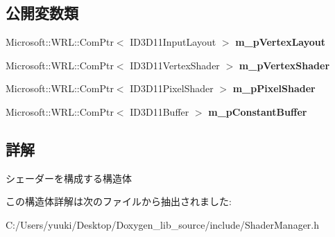 \subsection*{公開変数類}
\begin{DoxyCompactItemize}
\item 
Microsoft\+::\+W\+R\+L\+::\+Com\+Ptr$<$ I\+D3\+D11\+Input\+Layout $>$ {\bfseries m\+\_\+p\+Vertex\+Layout}\hypertarget{struct_d3_d11_1_1_graphic_1_1_shader_data_a172d8b3628a96db42c5ce5b678f050ee}{}\label{struct_d3_d11_1_1_graphic_1_1_shader_data_a172d8b3628a96db42c5ce5b678f050ee}

\item 
Microsoft\+::\+W\+R\+L\+::\+Com\+Ptr$<$ I\+D3\+D11\+Vertex\+Shader $>$ {\bfseries m\+\_\+p\+Vertex\+Shader}\hypertarget{struct_d3_d11_1_1_graphic_1_1_shader_data_a214d2e5cfa8ebb658b73698383f3fd4c}{}\label{struct_d3_d11_1_1_graphic_1_1_shader_data_a214d2e5cfa8ebb658b73698383f3fd4c}

\item 
Microsoft\+::\+W\+R\+L\+::\+Com\+Ptr$<$ I\+D3\+D11\+Pixel\+Shader $>$ {\bfseries m\+\_\+p\+Pixel\+Shader}\hypertarget{struct_d3_d11_1_1_graphic_1_1_shader_data_a564e3a5995e3025bd764cb623f148bbc}{}\label{struct_d3_d11_1_1_graphic_1_1_shader_data_a564e3a5995e3025bd764cb623f148bbc}

\item 
Microsoft\+::\+W\+R\+L\+::\+Com\+Ptr$<$ I\+D3\+D11\+Buffer $>$ {\bfseries m\+\_\+p\+Constant\+Buffer}\hypertarget{struct_d3_d11_1_1_graphic_1_1_shader_data_a8b766223ee2a0f8093ac0002fbe7bc9c}{}\label{struct_d3_d11_1_1_graphic_1_1_shader_data_a8b766223ee2a0f8093ac0002fbe7bc9c}

\end{DoxyCompactItemize}


\subsection{詳解}
シェーダーを構成する構造体 

この構造体詳解は次のファイルから抽出されました\+:\begin{DoxyCompactItemize}
\item 
C\+:/\+Users/yuuki/\+Desktop/\+Doxygen\+\_\+lib\+\_\+source/include/Shader\+Manager.\+h\end{DoxyCompactItemize}
